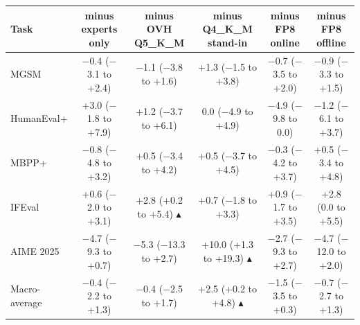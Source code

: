 \begin{tabular}{@{}lccccc@{}}
\toprule
Task & minus experts only & minus OVH Q5\_K\_M & minus Q4\_K\_M stand-in & minus FP8 online & minus FP8 offline \\
\midrule
MGSM & $-$0.4 ($-$3.1 to +2.4) & $-$1.1 ($-$3.8 to +1.6) & +1.3 ($-$1.5 to +3.8) & $-$0.7 ($-$3.5 to +2.0) & $-$0.9 ($-$3.3 to +1.5) \\
HumanEval+ & +3.0 ($-$1.8 to +7.9) & +1.2 ($-$3.7 to +6.1) & 0.0 ($-$4.9 to +4.9) & $-$4.9 ($-$9.8 to 0.0) & $-$1.2 ($-$6.1 to +3.7) \\
MBPP+ & $-$0.8 ($-$4.8 to +3.2) & +0.5 ($-$3.4 to +4.2) & +0.5 ($-$3.7 to +4.5) & $-$0.3 ($-$4.2 to +3.7) & +0.5 ($-$3.4 to +4.8) \\
IFEval & +0.6 ($-$2.0 to +3.1) & \cellcolor[HTML]{CDEBDD}+2.8 (+0.2 to +5.4) \textcolor[HTML]{1B7F5A}{$\blacktriangle$} & +0.7 ($-$1.8 to +3.3) & +0.9 ($-$1.7 to +3.5) & +2.8 (0.0 to +5.5) \\
AIME 2025 & $-$4.7 ($-$9.3 to +0.7) & $-$5.3 ($-$13.3 to +2.7) & \cellcolor[HTML]{CDEBDD}+10.0 (+1.3 to +19.3) \textcolor[HTML]{1B7F5A}{$\blacktriangle$} & $-$2.7 ($-$9.3 to +2.7) & $-$4.7 ($-$12.0 to +2.0) \\
\midrule
Macro-average & $-$0.4 ($-$2.2 to +1.3) & $-$0.4 ($-$2.5 to +1.7) & \cellcolor[HTML]{CDEBDD}+2.5 (+0.2 to +4.8) \textcolor[HTML]{1B7F5A}{$\blacktriangle$} & $-$1.5 ($-$3.5 to +0.3) & $-$0.7 ($-$2.7 to +1.3) \\
\bottomrule
\end{tabular}

